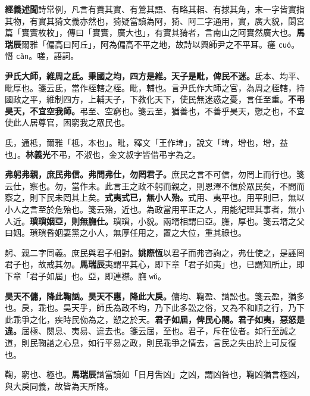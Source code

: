 \begin{quoting}\textbf{經義述聞}詩常例，凡言有蕡其實、有鶯其語、有略其耜、有捄其角，末一字皆實指其物，有實其猗文義亦然也，猗疑當讀為阿，猗、阿二字通用，實，廣大貌，閟宮篇「實實枚枚」，傳曰「實實，廣大也」，有實其猗者，言南山之阿實然廣大也。\textbf{馬瑞辰}爾雅「偏高曰阿丘」，阿為偏高不平之地，故詩以興師尹之不平耳。瘥 \texttt{cuó}。憯 \texttt{cǎn}。嗟，語詞。\end{quoting}

\textbf{尹氏大師，維周之氐。秉國之均，四方是維。天子是毗，俾民不迷。}{\footnotesize 氐本、均平、毗厚也。箋云氐，當作桎轄之桎。毗，輔也。言尹氏作大師之官，為周之桎轄，持國政之平，維制四方，上輔天子，下教化天下，使民無迷惑之憂，言任至重。}\textbf{不弔昊天，不宜空我師。}{\footnotesize 弔至、空窮也。箋云至，猶善也，不善乎昊天，愬之也，不宜使此人居尊官，困窮我之眾民也。}

\begin{quoting}氐，通柢，爾雅「柢，本也」。毗，釋文「王作埤」，說文「埤，增也，增，益也」。\textbf{林義光}不弔，不淑也，金文叔字皆借弔字為之。\end{quoting}

\textbf{弗躬弗親，庶民弗信。弗問弗仕，勿罔君子。}{\footnotesize 庶民之言不可信，勿罔上而行也。箋云仕，察也。勿，當作未。此言王之政不躬而親之，則恩澤不信於眾民矣，不問而察之，則下民未罔其上矣。}\textbf{式夷式已，無小人殆。}{\footnotesize 式用、夷平也。用平則已，無以小人之言至於危殆也。箋云殆，近也。為政當用平正之人，用能紀理其事者，無小人近。}\textbf{瑣瑣姻亞，則無膴仕。}{\footnotesize 瑣瑣，小貌。兩壻相謂曰亞。膴，厚也。箋云壻之父曰姻。瑣瑣昏姻妻黨之小人，無厚任用之，置之大位，重其祿也。}

\begin{quoting}躬、親二字同義。庶民與君子相對。\textbf{姚際恆}以君子而弗咨詢之，弗仕使之，是誣罔君子也，故戒其勿。\textbf{馬瑞辰}夷謂平其心，即下章「君子如夷」也，已謂知所止，即下章「君子如屆」也。亞，即連襟。膴 \texttt{wǔ}。\end{quoting}

\textbf{昊天不傭，降此鞠訩。昊天不惠，降此大戾。}{\footnotesize 傭均、鞠盈、訩訟也。箋云盈，猶多也。戾，乖也。昊天乎，師氏為政不均，乃下此多訟之俗，又為不和順之行，乃下此乖爭之化，疾時民俲為之，愬之於天。}\textbf{君子如屆，俾民心闋。君子如夷，惡怒是違。}{\footnotesize 屆極、闋息、夷易、違去也。箋云屆，至也。君子，斥在位者。如行至誠之道，則民鞠訩之心息，如行平易之政，則民乖爭之情去，言民之失由於上可反復也。}

\begin{quoting}鞠，窮也、極也。\textbf{馬瑞辰}訩當讀如「日月吿凶」之凶，謂凶咎也，鞠凶猶言極凶，與大戾同義，故皆為天所降。\end{quoting}

